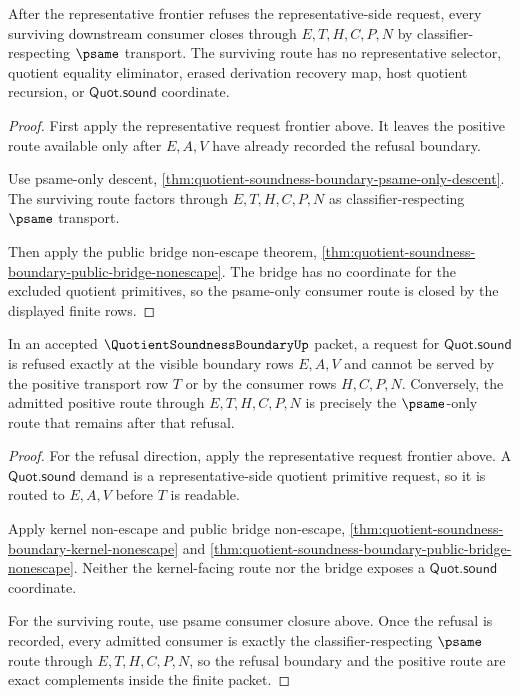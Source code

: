 \begin{theorem}
\label{thm:quotient-soundness-boundary-psame-consumer-closure}
After the representative frontier refuses the representative-side request, every surviving downstream consumer closes through $E,T,H,C,P,N$ by classifier-respecting $\psame$ transport. The surviving route has no representative selector, quotient equality eliminator, erased derivation recovery map, host quotient recursion, or $\mathsf{Quot.sound}$ coordinate.
\end{theorem}
\begin{proof}
First apply the representative request frontier above. It leaves the positive route available only after $E,A,V$ have already recorded the refusal boundary.

Use psame-only descent, \autoref{thm:quotient-soundness-boundary-psame-only-descent}. The surviving route factors through $E,T,H,C,P,N$ as classifier-respecting $\psame$ transport.

Then apply the public bridge non-escape theorem, \autoref{thm:quotient-soundness-boundary-public-bridge-nonescape}. The bridge has no coordinate for the excluded quotient primitives, so the psame-only consumer route is closed by the displayed finite rows.
\end{proof}

\begin{theorem}
\label{thm:quotient-soundness-boundary-quot-sound-refusal-exactness}
In an accepted $\QuotientSoundnessBoundaryUp$ packet, a request for $\mathsf{Quot.sound}$ is refused exactly at the visible boundary rows $E,A,V$ and cannot be served by the positive transport row $T$ or by the consumer rows $H,C,P,N$. Conversely, the admitted positive route through $E,T,H,C,P,N$ is precisely the $\psame$-only route that remains after that refusal.
\end{theorem}
\begin{proof}
For the refusal direction, apply the representative request frontier above. A $\mathsf{Quot.sound}$ demand is a representative-side quotient primitive request, so it is routed to $E,A,V$ before $T$ is readable.

Apply kernel non-escape and public bridge non-escape, \autoref{thm:quotient-soundness-boundary-kernel-nonescape} and \autoref{thm:quotient-soundness-boundary-public-bridge-nonescape}. Neither the kernel-facing route nor the bridge exposes a $\mathsf{Quot.sound}$ coordinate.

For the surviving route, use psame consumer closure above. Once the refusal is recorded, every admitted consumer is exactly the classifier-respecting $\psame$ route through $E,T,H,C,P,N$, so the refusal boundary and the positive route are exact complements inside the finite packet.
\end{proof}

